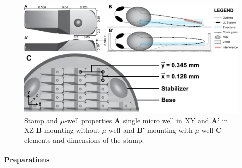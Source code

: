 \documentclass[11pt,singlespacinge,twoside]{reedthesis} %
\begin{document}
\begin{figure}

{\centering \includegraphics[width=0.8\linewidth]{figures/materials/mounting/mountmicro} 

}

\caption[Stamp and micro-well properties]{Stamp and \(\mu\)-well properties \textbf{A} single micro well in XY and \textbf{A'} in XZ \textbf{B} mounting without \(\mu\)-well and \textbf{B'} mounting with \(\mu\)-well \textbf{C} elements and dimensions of the stamp.}\label{fig:Mountmicro}
\end{figure}
\hypertarget{preparations}{%
\paragraph{Preparations}\label{preparations}}
\end{document}
